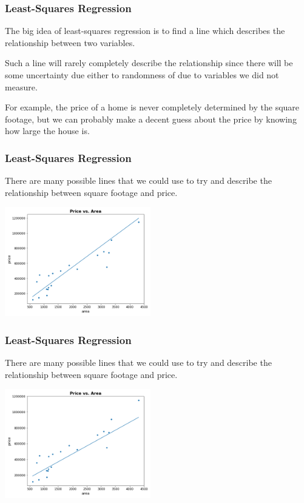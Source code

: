 \documentclass[11pt, table]{beamer}
\begin{document}
\begin{frame}
\frametitle{Least-Squares Regression}
The big idea of least-squares regression is to find a line which describes the relationship between two variables.
\vspace{0.1in}

Such a line will rarely completely describe the relationship since there will be some uncertainty due either to randomness of due to variables we did not measure.
\vspace{0.1in}

For example, the price of a home is never completely determined by the square footage, but we can probably make a decent guess about the price by knowing how large the house is.
\end{frame}

\begin{frame}
\frametitle{Least-Squares Regression}
There are many possible lines that we could use to try and describe the relationship between square footage and price.

\begin{center}
	\includegraphics[width=2.5in]{images/Appraisal_Values/ols_01.png}
\end{center}

\end{frame}

\begin{frame}
\frametitle{Least-Squares Regression}
There are many possible lines that we could use to try and describe the relationship between square footage and price.

\begin{center}
	\includegraphics[width=2.5in]{images/Appraisal_Values/ols_02.png}
\end{center}

\end{frame}
\end{document}
